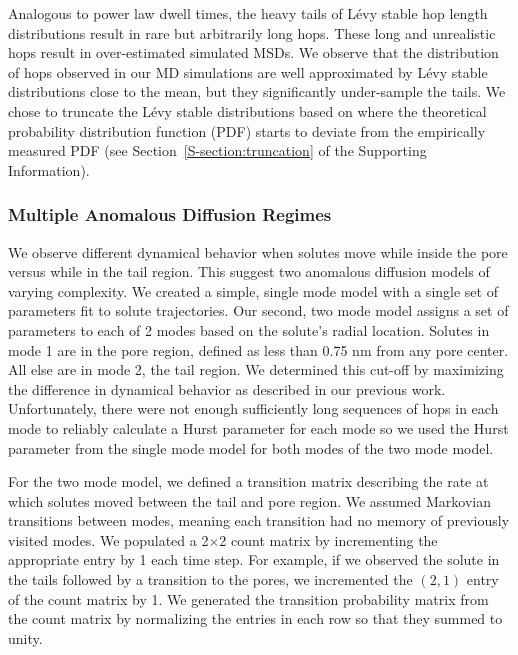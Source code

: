 \documentclass[12pt]{article}
\begin{document}
  Analogous to power law dwell times, the heavy tails of L\'evy stable 
  hop length distributions result in rare but arbitrarily long hops. These long
  and unrealistic hops result in over-estimated simulated MSDs. We observe that
  the distribution of hops observed in our MD simulations are well approximated 
  by L\'evy stable distributions close to the mean, but they significantly under-sample
  the tails. We chose to truncate the L\'evy stable distributions based
  on where the theoretical probability distribution function (PDF) starts to 
  deviate from the empirically measured PDF (see Section~\ref{S-section:truncation}
  of the Supporting Information).~\cite{mantegna_stochastic_1994}

  \subsubsection*{Multiple Anomalous Diffusion Regimes}
  
  We observe different dynamical behavior when solutes move while inside 
  the pore versus while in the tail region. This suggest two anomalous diffusion 
  models of varying complexity. We created a simple, single mode model with a single 
  set of parameters fit to solute trajectories.
  Our second, two mode model assigns a set of parameters to each of 2 modes based
  on the solute's radial location. Solutes in mode 1 are in the pore region, defined
  as less than 0.75 nm from any pore center. All else are in mode 2, the tail region. 
  We determined this cut-off by maximizing the difference in dynamical behavior as 
  described in our previous work.~\cite{coscia_chemically_2019} Unfortunately, 
  there were not enough sufficiently long sequences of hops in each mode to reliably
  calculate a Hurst parameter for each mode so we used the Hurst parameter from the 
  single mode model for both modes of the two mode model.
  
 
  For the two mode model, we defined a transition matrix describing the rate at
  which solutes moved between the tail and pore region. We assumed Markovian transitions
  between modes, meaning each transition had no memory of previously visited modes. 
  We populated a 2$\times$2 count matrix by incrementing the appropriate entry by 1 each time step. 
  For example, if we observed the solute in the tails followed by a transition to 
  the pores, we incremented the $(2, 1)$ entry of the count matrix by 1. We generated
  the transition probability matrix from the count matrix by normalizing the 
  entries in each row so that they summed to unity.
 
\end{document}
